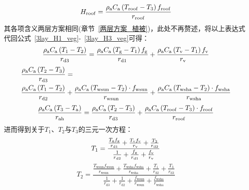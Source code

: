 %
\begin{equation}\label{urban_Hroof_3_veg}
  H_{\mathrm{roof}} = \frac{\rho _{\rm a} C_{\mathrm a} \left( T_{\mathrm{roof}} - T_{\mathrm{3}} \right) f_{\mathrm{roof}}}{r_{\mathrm{roof}}}
\end{equation}
其各项含义两层方案相同(章节~\ref{两层方案_植被})，此处不再赘述，将以上表达式代回公式~\eqref{3lay_H1_veg}-~\eqref{3lay_H3_veg}可得：
%
\begin{equation}
  \frac{\rho _{\rm a} C_{\mathrm a} \left( T_{1} - T_{2} \right)}{r_{\mathrm{d3}}} = \frac{\rho _{\rm a} C_{\mathrm a} \left( T_{\mathrm{g}} - T_{1} \right) f_{\mathrm{g}}}{r_{\mathrm{d1}}} + \frac{\rho _{\rm a} C_{\mathrm a} \left( T_{\mathrm{v}} - T_{1} \right) f_{\rm v}}{r_{\mathrm{v}}}
\end{equation}
%
\begin{equation}
  \begin{split}
    & \frac{\rho _{\rm a} C_{\mathrm a} \left( T_{2} - T_{3} \right)}{r_{\mathrm{d3}}} = \\
    & \frac{\rho _{\rm a} C_{\mathrm a} \left( T_{1} - T_{2} \right) }{r_{\mathrm{d2}}} + \frac{\rho _{\rm a} C_{\mathrm a} \left( T_{\mathrm{wsun}} - T_{2} \right) \cdot f_{\mathrm{wsun}}}{r_{\mathrm{wsun}}} + \frac{\rho _{\rm a} C_{\mathrm a} \left( T_{\mathrm{wsha}} - T_{2} \right) \cdot f_{\mathrm{wsha}}}{r_{\mathrm{wsha}}}
  \end{split}
\end{equation}
%
\begin{equation}
  \begin{split}
    \frac{\rho _{\rm a} C_{\mathrm a} \left( T_{3} - T_{\rm a} \right)}{r_{\mathrm{ah}}} =
    \frac{\rho _{\rm a} C_{\mathrm a} \left( T_{2} - T_{3} \right)}{r_{\mathrm{d3}}} + \frac{\rho _{\rm a} C_{\mathrm a} \left( T_{\mathrm{roof}} - T_{3} \right)\cdot f_{\mathrm{roof}}}{r_{\mathrm{roof}}}
  \end{split}
\end{equation}
%
进而得到关于$T_{1}$、$T_{2}$与$T_{3}$的三元一次方程：
%
\begin{equation}
  \label{3lay_T1_veg}
  T_{1} =\frac{ \frac{T_{\mathrm{g}} f_{\mathrm{g}}}{r_{\mathrm{d1}}} + \frac{T_{\mathrm{v}} f_{\rm v}}{r_{\mathrm{v}}} + \frac{T_{2}}{r_{\mathrm{d2}}} }{\frac{1}{r_{\mathrm{d2}}} + \frac{f_{\mathrm{g}}}{r_{\mathrm{d1}}} + \frac{f_{\rm v}}{r_{\mathrm{v}}}}
\end{equation}
%
\begin{equation}
  T_{2} = \frac{\frac{T_{\mathrm{wsun}} f_{\mathrm{wsun}}}{r_{\mathrm{wsun}}} + \frac{T_{\mathrm{wsha}} f_{\mathrm{wsha}}}{r_{\mathrm{wsha}}} +  \frac{T_{1}}{r_{\mathrm{d2}}} + \frac{T_{3}}{r_{\mathrm{d3}}}}{\frac{1}{r_{\mathrm{d3}}} + \frac{1}{r_{\mathrm{d2}}} + \frac{f_{\mathrm{wsun}}}{r_{\mathrm{wsun}}} + \frac{f_{\mathrm{wsha}}}{r_{\mathrm{wsha}}}}
\end{equation}
